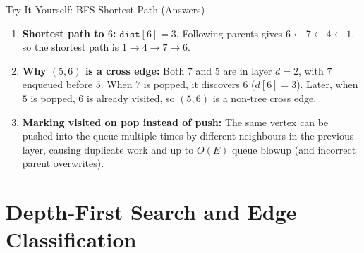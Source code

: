 \documentclass{beamer}
\begin{document}
\begin{frame}{Try It Yourself: BFS Shortest Path (Answers)}
  \begin{enumerate}
    \item \textbf{Shortest path to $6$:} $\texttt{dist}[6] = 3$. Following parents gives $6 \leftarrow 7 \leftarrow 4 \leftarrow 1$, so the shortest path is $1 \to 4 \to 7 \to 6$.
    \item \textbf{Why $(5, 6)$ is a cross edge:} Both $7$ and $5$ are in layer $d = 2$, with $7$ enqueued before $5$. When $7$ is popped, it discovers $6$ ($d[6] = 3$). Later, when $5$ is popped, $6$ is already visited, so $(5, 6)$ is a non-tree cross edge.
    \item \textbf{Marking visited on pop instead of push:} The same vertex can be pushed into the queue multiple times by different neighbours in the previous layer, causing duplicate work and up to $O(E)$ queue blowup (and incorrect parent overwrites).
  \end{enumerate}
\end{frame}

\section{Depth-First Search and Edge Classification}
\end{document}

